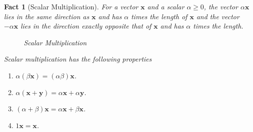 \documentclass[11pt,reqno,openany]{amsbook}
\numberwithin{figure}{chapter}
\numberwithin{equation}{chapter}
\theoremstyle{plain}
\newtheorem{fact}{Fact}[chapter]
\theoremstyle{definition}
\renewcommand{\vec}[1]{\mathbf{#1}}
\begin{document}
\begin{fact}[Scalar Multiplication]
  For a vector $\vec{x}$ and a scalar $\alpha\ge 0$, the vector
  $\alpha\vec{x}$ lies in the same direction as $\vec{x}$ and has
  $\alpha$ times the length of $\vec{x}$ and the vector
  $-\alpha\vec{x}$ lies in the direction exactly opposite that of
  $\vec{x}$ and has $\alpha$ times the length.
  
  \begin{figure}[h]
  \caption{Scalar Multiplication}
  \end{figure}

  Scalar multiplication has the following properties
  \begin{enumerate}
  \item $\alpha(\beta \vec{x}) = (\alpha \beta) \vec{x}$.
  \item $\alpha(\vec{x}+\vec{y}) = \alpha\vec{x} + \alpha\vec{y}$.
  \item $(\alpha + \beta)\vec{x} = \alpha\vec{x} + \beta\vec{x}$.
  \item $1\vec{x} = \vec{x}$.
  \end{enumerate}
\end{fact}
\end{document}
